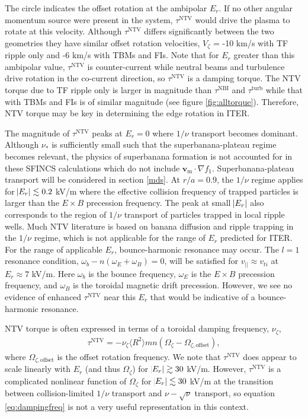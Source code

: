 \documentclass[aip, pop, preprint]{revtex4-1}
\begin{document}
The circle indicates the offset rotation at the ambipolar $E_r$. If no other angular momentum source were present in the system, $\tau^{\mathrm{NTV}}$ would drive the plasma to rotate at this velocity. Although $\tau^{\mathrm{NTV}}$ differs significantly between the two geometries they have similar offset rotation velocities, $V_{\zeta}$ = -10 km/s with TF ripple only and -6 km/s with TBMs and FIs. Note that for $E_r$ greater than this ambipolar value, $\tau^{\mathrm{NTV}}$ is counter-current while neutral beams and turbulence drive rotation in the co-current direction, so $\tau^{\mathrm{NTV}}$ is a damping torque. The NTV torque due to TF ripple only is larger in magnitude than $\tau^{\mathrm{NBI}}$ and $\tau^{\mathrm{turb}}$ while that with TBMs and FIs is of similar magnitude (see figure \ref{fig:alltorque}). Therefore, NTV torque may be key in determining the edge rotation in ITER. 

The magnitude of $\tau^{\mathrm{NTV}}$ peaks at $E_r = 0$ where $1/\nu$ transport becomes dominant. Although $\nu_*$ is sufficiently small such that the superbanana-plateau regime becomes relevant, the physics of superbanana formation is not accounted for in these SFINCS calculations which do not include $\bm{v}_{\mathrm{m}} \cdot \nabla f_1$. Superbanana-plateau transport will be considered in section \ref{mds}. At $r/a = 0.9$, the $1/\nu$ regime applies for $\abs{E_r} \lesssim 0.2$ kV/m where the effective collision frequency of trapped particles is larger than the $E \times B$ precession frequency. The peak at small $\abs{E_r}$ also corresponds to the region of $1/\nu$ transport of particles trapped in local ripple wells. Much NTV literature is based on banana diffusion and ripple trapping in the $1/\nu$ regime,\cite{Stringer1972, Connor1974} which is not applicable for the range of $E_r$ predicted for ITER. For the range of applicable $E_r$, bounce-harmonic resonance may occur. The $l =1$ resonance condition, $\omega_b - n(\omega_E + \omega_B) = 0$, will be satisfied for $v_{||} \approx v_{ti}$ at $E_r \approx 7$ kV/m. Here $\omega_b$ is the bounce frequency, $\omega_E$ is the $E \times B$ precession frequency, and $\omega_B$ is the toroidal magnetic drift precession.\cite{Park2009} However, we see no evidence of enhanced $\tau^{\mathrm{NTV}}$ near this $E_r$ that would be indicative of a bounce-harmonic resonance.

NTV torque is often expressed in terms of a toroidal damping frequency, $\nu_{\zeta}$,
\begin{gather}
\tau^{\mathrm{NTV}} = - \nu_{\zeta} \langle R^2 \rangle m n ( \Omega_{\zeta} - \Omega_{\zeta, \mathrm{offset}}),
\label{eq:dampingfreq}
\end{gather}
where $\Omega_{\zeta, \mathrm{offset}}$ is the offset rotation frequency. We note that $\tau^{\mathrm{NTV}}$ does appear to scale linearly with $E_r$ (and thus $\Omega_{\zeta}$) for $\abs{E_r} \gtrsim 30$ kV/m. However, $\tau^{\mathrm{NTV}}$ is a complicated nonlinear function of $\Omega_{\zeta}$ for $\abs{E_r} \lesssim 30$ kV/m at the transition between collision-limited $1/\nu$ transport and $\nu-\sqrt{\nu}$ transport, so equation \ref{eq:dampingfreq} is not a very useful representation in this context. 
\end{document}
